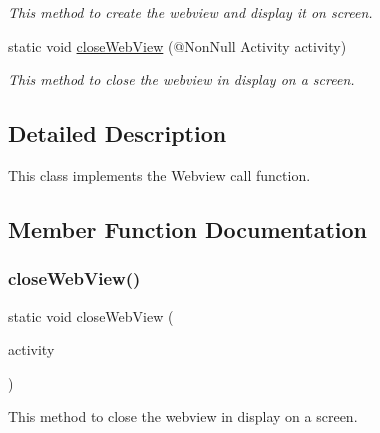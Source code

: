 \begin{DoxyCompactItemize}
\begin{DoxyCompactList}\small\item\em This method to create the webview and display it on screen. \end{DoxyCompactList}\item 
static void \hyperlink{classcom_1_1toast_1_1android_1_1gamebase_1_1_gamebase_1_1_web_view_ac34aa05ab2a46ea437f0c8d44c8395de}{close\+Web\+View} (@Non\+Null Activity activity)
\begin{DoxyCompactList}\small\item\em This method to close the webview in display on a screen. \end{DoxyCompactList}\end{DoxyCompactItemize}


\subsection{Detailed Description}
This class implements the Webview call function. 

\subsection{Member Function Documentation}
\mbox{\label{classcom_1_1toast_1_1android_1_1gamebase_1_1_gamebase_1_1_web_view_ac34aa05ab2a46ea437f0c8d44c8395de}} 
\subsubsection{\texorpdfstring{close\+Web\+View()}{closeWebView()}}
{\footnotesize\ttfamily static void close\+Web\+View (\begin{DoxyParamCaption}\item[{@Non\+Null Activity}]{activity }\end{DoxyParamCaption})\hspace{0.3cm}{\ttfamily [static]}}



This method to close the webview in display on a screen. 

